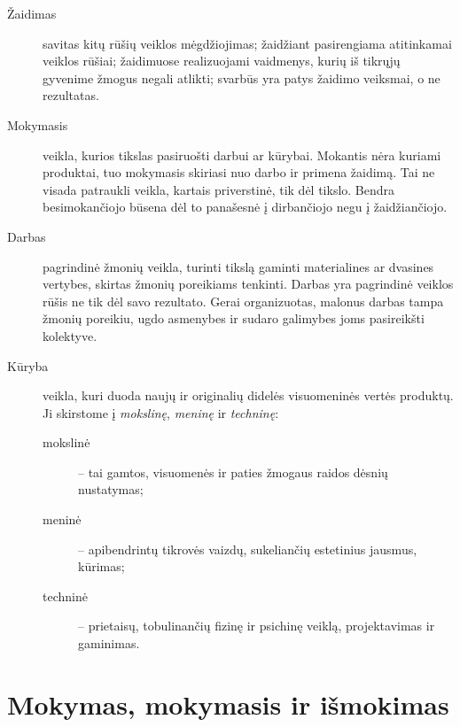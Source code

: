 \begin{description}
  \item[Žaidimas] savitas kitų rūšių veiklos mėgdžiojimas; žaidžiant 
    pasirengiama atitinkamai veiklos rūšiai; žaidimuose realizuojami 
    vaidmenys, kurių iš tikrųjų gyvenime žmogus negali atlikti; svarbūs yra 
    patys žaidimo veiksmai, o ne rezultatas.
  \item[Mokymasis] veikla, kurios tikslas pasiruošti darbui ar kūrybai.  
    Mokantis nėra kuriami produktai, tuo mokymasis skiriasi nuo darbo ir 
    primena žaidimą. Tai ne visada patraukli veikla, kartais priverstinė, 
    tik dėl tikslo. Bendra besimokančiojo būsena dėl to panašesnė į 
    dirbančiojo negu į žaidžiančiojo.
  \item[Darbas] pagrindinė žmonių veikla, turinti tikslą gaminti 
    materialines ar dvasines vertybes, skirtas žmonių poreikiams tenkinti. 
    Darbas yra pagrindinė veiklos rūšis ne tik dėl savo rezultato. Gerai 
    organizuotas, malonus darbas tampa žmonių poreikiu, ugdo asmenybes ir 
    sudaro galimybes joms pasireikšti kolektyve.
  \item[Kūryba] veikla, kuri duoda naujų ir originalių didelės visuomeninės 
    vertės produktų. Ji skirstome į \emph{mokslinę}, \emph{meninę} ir 
    \emph{techninę}: 
    \begin{description}
      \item[mokslinė] – tai gamtos, visuomenės ir paties žmogaus raidos 
        dėsnių nustatymas;
      \item[meninė] – apibendrintų tikrovės vaizdų, sukeliančių
        estetinius jausmus, kūrimas;
      \item[techninė] – prietaisų, tobulinančių fizinę ir psichinę veiklą, 
        projektavimas ir gaminimas.
    \end{description}
\end{description}

\section{Mokymas, mokymasis ir išmokimas}

\label{tema:mokymas_mokymasis}

